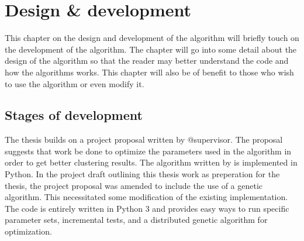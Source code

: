 
\chapter{Design \& development} %

\label{DesignDevelopment} %


This chapter on the design and development of the algorithm will briefly touch on the development of the algorithm. The chapter will go into some detail about the design of the algorithm so that the reader may better understand the code and how the algorithms works. This chapter will also be of benefit to those who wish to use the algorithm or even modify it.

\section{Stages of development}
The thesis builds on a project proposal written by @supervisor. The proposal suggests that work be done to optimize the parameters used in the \STC algorithm in order to get better clustering results. The \CTC algorithm written by \supervisor is implemented in Python. In the project draft outlining this thesis work as preperation for the thesis, the project proposal was amended to include the use of a genetic algorithm. This necessitated some modification of the existing implementation. The code is entirely written in Python 3 and provides easy ways to run specific parameter sets, incremental tests, and a distributed genetic algorithm for optimization.


